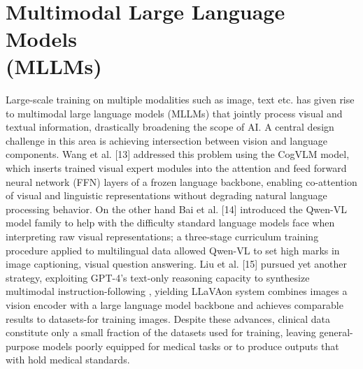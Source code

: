 ﻿﻿\documentclass[12pt]{report}
\begin{document}
\section[Multimodal Large Language Models (MLLMs)]{Multimodal Large Language Models \\ (MLLMs)}
Large-scale training on multiple modalities such as image, text etc. has given rise to multimodal large language models (MLLMs) that jointly process visual and textual information, drastically broadening the scope of AI. A central design challenge in this area is achieving intersection between vision and language components. Wang et al. [13] addressed this problem using the CogVLM model, which inserts trained visual expert modules into the attention and feed forward neural network (FFN) layers of a frozen language backbone, enabling co-attention of visual and linguistic representations without degrading natural language processing behavior. On the other hand Bai et al. [14] introduced the Qwen-VL model family to help with the difficulty standard language models face when interpreting raw visual representations; a three-stage curriculum training procedure applied to multilingual data allowed Qwen-VL to set high marks in image captioning, visual question answering. Liu et al. [15] pursued yet another strategy, exploiting GPT-4's text-only reasoning capacity to synthesize multimodal instruction-following , yielding LLaVAon system combines images a vision encoder with a large language model backbone and achieves comparable results to datasets-for training images. Despite these advances, clinical data constitute only a small fraction of the datasets used for training, leaving general-purpose models poorly equipped for medical tasks or to produce outputs that with hold medical standards.
\end{document}
